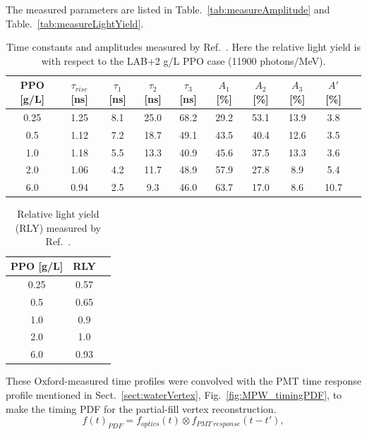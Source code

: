 The measured parameters are listed in Table.~\ref{tab:measureAmplitude} and Table.~\ref{tab:measureLightYield}.
\begin{table}[ht]
	\centering\label{tab:measureAmplitude}
	\caption{\label{oxfordMeasure} Time constants and amplitudes measured by Ref.~\cite{oxfordMeasurement}. Here the relative light yield is with respect to the LAB+2 g/L PPO case (11900 photons/MeV).}	
	{\centering
		\begin{tabular*}{160mm}{c@{\extracolsep{\fill}}ccccccccc}
			\toprule 
			PPO [g/L] & $\tau_{rise}$ [ns] & $\tau_1$ [ns] & $\tau_2$ [ns] & $\tau_3$ [ns] & $A_1$ [\%]  & $A_2$ [\%]   & $A_3$ [\%]  & $A'$ [\%] \\
			\midrule
			0.25 & 1.25 & 8.1 & 25.0 & 68.2 & 29.2 & 53.1 & 13.9 & 3.8\\
			0.5  & 1.12 & 7.2 & 18.7 & 49.1 & 43.5 & 40.4 & 12.6 & 3.5 \\
			1.0 & 1.18 & 5.5 & 13.3 & 40.9 & 45.6 & 37.5 & 13.3 & 3.6 \\
			2.0 & 1.06 & 4.2 & 11.7 & 48.9 & 57.9 & 27.8 & 8.9 & 5.4	\\
			6.0 & 0.94 & 2.5 & 9.3  & 46.0 & 63.7 & 17.0 & 8.6 & 10.7\\
			\bottomrule	
		\end{tabular*}
	}
\end{table}

\begin{table}[ht]
	\centering\label{tab:measureLightYield}
	\caption{\label{oxfordMeasure2}Relative light yield (RLY) measured by Ref.~\cite{oxfordMeasurement}.}	
	{\centering
		\begin{tabular*}{60mm}{c@{\extracolsep{\fill}}cc}
			\toprule 
			PPO [g/L] & RLY \\
			\midrule
			0.25 & 0.57\\
			0.5 & 0.65\\
			1.0 & 0.9\\
			2.0 & 1.0\\
			6.0 & 0.93\\
			\bottomrule	
		\end{tabular*}
	}
\end{table}

These Oxford-measured time profiles were convolved with the PMT time response profile mentioned in Sect.~\ref{sect:waterVertex}, Fig.~\ref{fig:MPW_timingPDF}, to make the timing PDF for the partial-fill vertex reconstruction. 
\begin{equation}\label{eq:OxfordTimingPDF}
f(t)_{PDF} = f_{optics}(t)\otimes f_{PMT~response}(t-t'),
\end{equation}

